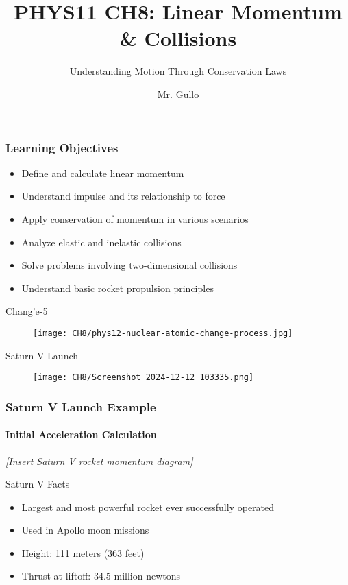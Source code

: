 \documentclass{beamer}
\title[Linear Momentum]{PHYS11 CH8: Linear Momentum \& Collisions}
\subtitle{Understanding Motion Through Conservation Laws}
\author[Mr. Gullo]{Mr. Gullo}
\date[]{}
\begin{document}
\frame{\titlepage}

\begin{frame}
\frametitle{Learning Objectives}
\begin{itemize}
\item Define and calculate linear momentum
\item Understand impulse and its relationship to force
\item Apply conservation of momentum in various scenarios
\item Analyze elastic and inelastic collisions
\item Solve problems involving two-dimensional collisions
\item Understand basic rocket propulsion principles
\end{itemize}
\end{frame}
\begin{frame}{Chang’e-5 }
    \begin{figure}
        \centering
        \texttt{[image: CH8/phys12-nuclear-atomic-change-process.jpg]}
    \end{figure}
\end{frame}

\begin{frame}{Saturn V Launch}
   \begin{figure}
       \centering
       \texttt{[image: CH8/Screenshot 2024-12-12 103335.png]}
   \end{figure}
\end{frame}

\begin{frame}
\frametitle{Saturn V Launch Example}
\framesubtitle{Initial Acceleration Calculation}

\begin{center}
\textit{[Insert Saturn V rocket momentum diagram]}
\end{center}

\begin{block}{Saturn V Facts}
\begin{itemize}
\item Largest and most powerful rocket ever successfully operated
\item Used in Apollo moon missions
\item Height: 111 meters (363 feet)
\item Thrust at liftoff: 34.5 million newtons
\end{itemize}
\end{block}
\end{frame}
\end{document}
